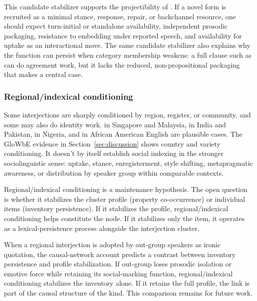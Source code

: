 \documentclass[12pt]{article}
\begin{document}
This candidate stabilizer supports the projectibility of
. If a novel form is recruited as a
minimal stance, response, repair, or backchannel resource, one should
expect turn-initial or standalone availability, independent prosodic
packaging, resistance to embedding under reported speech, and
availability for uptake as an interactional move. The same candidate
stabilizer also explains why the function can persist when category membership
weakens: a full clause such as  can do agreement work,
but it lacks the reduced, non-propositional packaging that makes
 a central  case.

\subsubsection{Regional/indexical conditioning}

Some interjections are sharply conditioned by region, register, or
community, and some may also do identity work.  in
Singapore and Malaysia,  in India and Pakistan,
 in Nigeria, and  in African American
English \citep{louf2023} are plausible cases. The GloWbE evidence in
Section~\ref{sec:discussion} shows country and variety conditioning. It
doesn't by itself establish social indexing in the stronger
sociolinguistic sense: uptake, stance, enregisterment, style shifting,
metapragmatic awareness, or distribution by speaker group within
comparable contexts.

Regional/indexical conditioning is a maintenance hypothesis.
The open question is whether it stabilizes the cluster profile (property
co-occurrence) or individual items (inventory persistence). If it
stabilizes the profile, regional/indexical conditioning helps constitute
the node. If it stabilizes only the item, it operates as a
lexical-persistence process alongside the interjection cluster.

When a regional interjection is adopted by out-group speakers as ironic
quotation, the causal-network account predicts a contrast between
inventory persistence and profile stabilization. If out-group
 loses prosodic isolation or emotive force while retaining
its social-marking function, regional/indexical conditioning stabilizes
the inventory alone. If it retains the full profile, the link is part of
the causal structure of the kind. This comparison remains for future
work.
\end{document}
